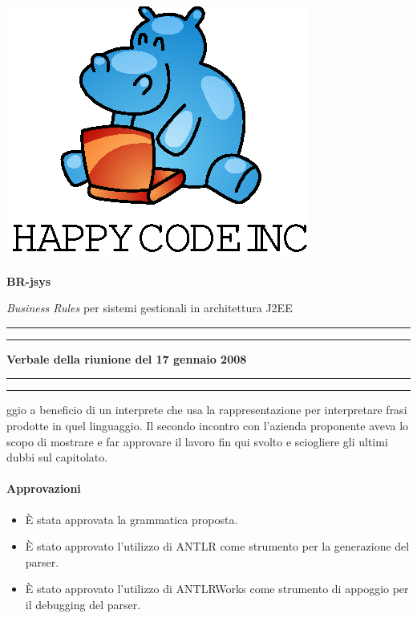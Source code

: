 \documentclass[11pt,titlepage,a4paper]{report}
\begin{document}
\begin{titlepage}
\begin{center}
\vspace*{0.5in}
\includegraphics{logo.eps}
\vspace*{0.2in}

{\Large \textbf{BR-jsys}}

{\Large \emph{Business Rules} per sistemi gestionali in architettura J2EE } 
\vspace{1.3in}
\par\rule{10cm}{.4pt} \par
\par\rule{12cm}{1pt} \par
\vspace*{0.5in}
\LARGE \textbf {Verbale della riunione del 17 gennaio 2008}
\vspace*{0.5in}
\par\rule{12cm}{1pt} \par
\par\rule{10cm}{.4pt} \par

\end{center}
\end{titlepage}
\vspace*{0.5in}
ggio a beneficio di un interprete che usa la rappresentazione per interpretare frasi prodotte in quel linguaggio.
\thispagestyle{plain}
Il secondo incontro con l'azienda proponente aveva lo scopo di mostrare e far approvare il lavoro fin qui svolto e sciogliere gli ultimi dubbi sul capitolato.

\paragraph{Approvazioni}
\begin{itemize}

\item \`E stata approvata la grammatica proposta.
\item \`E stato approvato l'utilizzo di ANTLR come strumento per la generazione del parser.
\item \`E stato approvato l'utilizzo di ANTLRWorks come strumento di appoggio per il debugging del parser.

\end{itemize}
\end{document}
